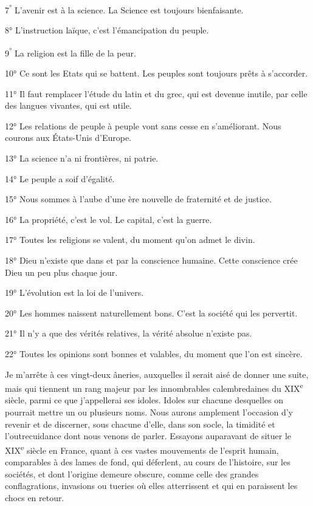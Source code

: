 \documentclass[french,twoside]{book} %
\begin{document}
7\textsuperscript{°} L’avenir est à la science. La Science est toujours bienfaisante.\par
8° L’instruction laïque, c’est l’émancipation du peuple.\par
9\textsuperscript{°} La religion est la fille de la peur.\par
10° Ce sont les Etats qui se battent. Les peuples sont toujours prêts à s’accorder.\par
11° Il faut remplacer l’étude du latin et du grec, qui est devenue inutile, par celle des langues vivantes, qui est utile.\par
12° Les relations de peuple à peuple vont sans cesse en s’améliorant. Nous courons aux États-Unis d’Europe.\par
13° La science n’a ni frontières, ni patrie.\par
14° Le peuple a soif d’égalité.\par
15° Nous sommes à l’aube d’une ère nouvelle de fraternité et de justice.\par
16° La propriété, c’est le vol. Le capital, c’est la guerre.\par
17° Toutes les religions se valent, du moment qu’on admet le divin.\par
18° Dieu n’existe que dans et par la conscience humaine. Cette conscience crée Dieu un peu plus chaque jour.\par
19° L’évolution est la loi de l’univers.\par
20° Les hommes naissent naturellement bons. C’est la société qui les pervertit.\par
21° Il n’y a que des vérités relatives, la vérité absolue n’existe pas.\par
22° Toutes les opinions sont bonnes et valables, du moment que l’on est sincère.\par
Je m’arrête à ces vingt-deux âneries, auxquelles il serait aisé de donner une suite, mais qui tiennent un rang majeur par les innombrables calembredaines du XIX\textsuperscript{e} siècle, parmi ce que j’appellerai ses idoles. Idoles sur chacune desquelles on pourrait mettre un ou plusieurs noms. Nous aurons amplement l’occasion d’y revenir et de discerner, sous chacune d’elle, dans son socle, la timidité et l’outrecuidance dont nous venons de parler. Essayons auparavant de situer le XIX\textsuperscript{e} siècle en France, quant à ces vastes mouvements de l’esprit humain, comparables à des lames de fond, qui déferlent, au cours de l’histoire, sur les sociétés, et dont l’origine demeure obscure, comme celle des grandes conflagrations, invasions ou tueries où elles atterrissent et qui en paraissent les chocs en retour.\par
\end{document}
